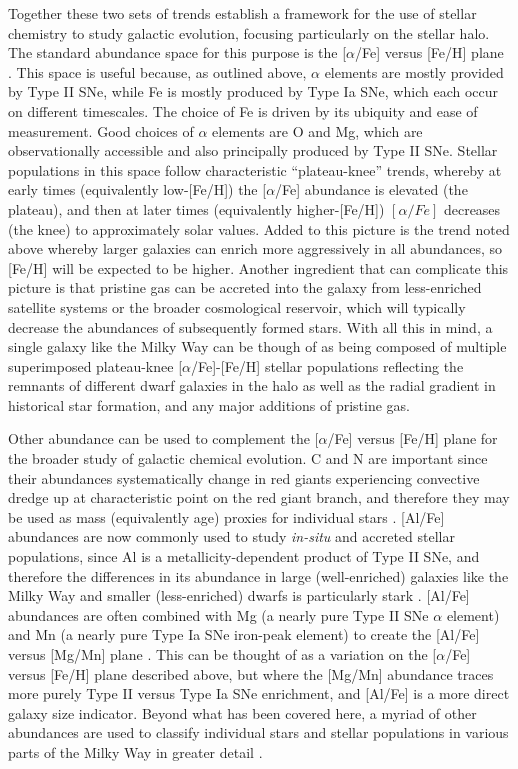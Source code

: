 Together these two sets of trends establish a framework for the use of stellar chemistry to study galactic evolution, focusing particularly on the stellar halo. The standard abundance space for this purpose is the [$\alpha$/Fe] versus [Fe/H] plane \parencite[e.g.][]{hawkins15}. This space is useful because, as outlined above, $\alpha$ elements are mostly provided by Type II SNe, while Fe is mostly produced by Type Ia SNe, which each occur on different timescales. The choice of Fe is driven by its ubiquity and ease of measurement. Good choices of $\alpha$ elements are O and Mg, which are observationally accessible and also principally produced by Type II SNe. Stellar populations in this space follow characteristic ``plateau-knee'' trends, whereby at early times (equivalently low-[Fe/H]) the [$\alpha$/Fe] abundance is elevated (the plateau), and then at later times (equivalently higher-[Fe/H]) $[\alpha/Fe]$ decreases (the knee) to approximately solar values. Added to this picture is the trend noted above whereby larger galaxies can enrich more aggressively in all abundances, so [Fe/H] will be expected to be higher. Another ingredient that can complicate this picture is that pristine gas can be accreted into the galaxy from less-enriched satellite systems or the broader cosmological reservoir, which will typically decrease the abundances of subsequently formed stars. With all this in mind, a single galaxy like the Milky Way can be though of as being composed of multiple superimposed plateau-knee [$\alpha$/Fe]-[Fe/H] stellar populations reflecting the remnants of different dwarf galaxies in the halo as well as the radial gradient in historical star formation, and any major additions of pristine gas. 

Other abundance can be used to complement the [$\alpha$/Fe] versus [Fe/H] plane for the broader study of galactic chemical evolution. C and N are important since their abundances systematically change in red giants experiencing convective dredge up at characteristic point on the red giant branch, and therefore they may be used as mass (equivalently age) proxies for individual stars \parencite[e.g.][]{martig16,mackereth19a}. [Al/Fe] abundances are now commonly used to study \textit{in-situ} and accreted stellar populations, since Al is a metallicity-dependent product of Type II SNe, and therefore the differences in its abundance in large (well-enriched) galaxies like the Milky Way and smaller (less-enriched) dwarfs is particularly stark \parencite[e.g.][]{hawkins15,das20,belokurov22}. [Al/Fe] abundances are often combined with Mg (a nearly pure Type II SNe $\alpha$ element) and Mn (a nearly pure Type Ia SNe iron-peak element) to create the [Al/Fe] versus [Mg/Mn] plane \parencite[e.g.][]{hawkins15,das20,horta21a,fernandez23}. This can be thought of as a variation on the [$\alpha$/Fe] versus [Fe/H] plane described above, but where the [Mg/Mn] abundance traces more purely Type II versus Type Ia SNe enrichment, and [Al/Fe] is a more direct galaxy size indicator. Beyond what has been covered here, a myriad of other abundances are used to classify individual stars and stellar populations in various parts of the Milky Way in greater detail \parencite[e.g. see][]{frebel15,barbuy18}. 

